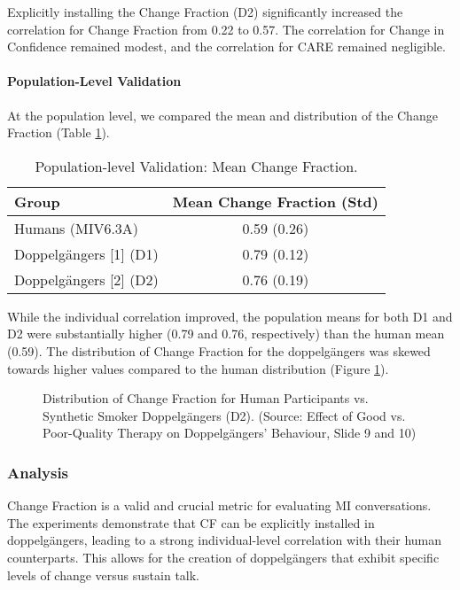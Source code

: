 Explicitly installing the Change Fraction (D2) significantly increased the correlation for Change Fraction from 0.22 to 0.57. The correlation for Change in Confidence remained modest, and the correlation for CARE remained negligible.

\paragraph{Population-Level Validation}

At the population level, we compared the mean and distribution of the Change Fraction (Table \ref{tab:cf_installation_population}).

\begin{table}[h]
\centering
\caption{Population-level Validation: Mean Change Fraction.}
\label{tab:cf_installation_population}
\begin{tabular}{|l|c|}
\hline
\textbf{Group} & \textbf{Mean Change Fraction (Std)} \\ \hline
Humans (MIV6.3A) & 0.59 (0.26) \\
Doppelgängers [1] (D1) & 0.79 (0.12) \\
Doppelgängers [2] (D2) & 0.76 (0.19) \\ \hline
\end{tabular}
\end{table}

While the individual correlation improved, the population means for both D1 and D2 were substantially higher (0.79 and 0.76, respectively) than the human mean (0.59). The distribution of Change Fraction for the doppelgängers was skewed towards higher values compared to the human distribution (Figure \ref{fig:cf_distribution}).

\begin{figure}[h]
    \centering
    \caption{Distribution of Change Fraction for Human Participants vs. Synthetic Smoker Doppelgängers (D2). (Source: Effect of Good vs. Poor-Quality Therapy on Doppelgängers’ Behaviour, Slide 9 and 10)}
    \label{fig:cf_distribution}
\end{figure}

\subsubsection{Analysis}

Change Fraction is a valid and crucial metric for evaluating MI conversations. The experiments demonstrate that CF can be explicitly installed in doppelgängers, leading to a strong individual-level correlation with their human counterparts. This allows for the creation of doppelgängers that exhibit specific levels of change versus sustain talk.

